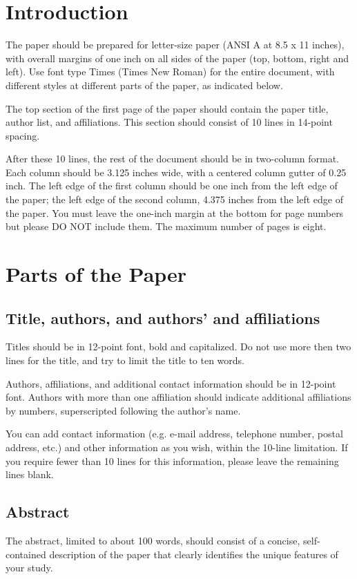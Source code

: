 \documentclass[twocolumn, 10pt, times, letterpaper]{article}
\begin{document}
\section{Introduction}
The paper should be prepared for letter-size paper (ANSI A at 8.5 x 11 inches), with overall margins of one inch on all sides of the paper (top, bottom, right and left). Use font type Times (Times New Roman) for the entire document, with different styles at different parts of the paper, as indicated below.

The top section of the first page of the paper should contain the paper title, author list, and affiliations. This section should consist of 10 lines in 14-point spacing.

After these 10 lines, the rest of the document should be in two-column format. Each column should be 3.125 inches wide, with a centered column gutter of 0.25 inch. The left edge of the first column should be one inch from the left edge of the paper; the left edge of the second column, 4.375 inches from the left edge of the paper. You must leave the one-inch margin at the bottom for page numbers but please DO NOT include them.  The maximum number of pages is eight.


\section{Parts of the Paper}
\subsection{Title, authors, and authors' and affiliations}
Titles should be in 12-point font, bold and capitalized. Do not use more then two lines for the title, and try to limit the title to ten words.

Authors, affiliations, and additional contact information should be in 12-point font. Authors with more than one affiliation should indicate additional affiliations by numbers, superscripted following the author's name.

You can add contact information (e.g. e-mail address, telephone number, postal address, etc.) and other information as you wish, within the 10-line limitation.  If you require fewer than 10 lines for this information, please leave the remaining lines blank.

\subsection{Abstract}
The abstract, limited to about 100 words, should consist of a concise, self-contained description of the paper that clearly identifies the unique features of your study.
\end{document}
